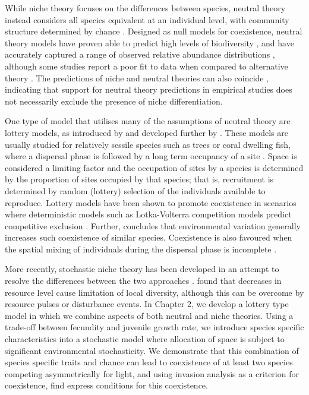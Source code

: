  While niche theory focuses on the differences between species, neutral theory instead considers all species equivalent at an individual level, with community structure determined by chance \citep[e.g.][]{hubbell1979tree,chave2004neutral,hubbell2001unified}. Designed as null models for coexistence, neutral theory models have proven able to predict high levels of biodiversity \citep[see ][ and references therein]{chave2004neutral,hubbell2001unified}, and have accurately captured a range of observed relative abundance distributions \citep[e.g.][]{volkov2003neutral}, although some studies report a poor fit to data when compared to alternative theory \citep[e.g.][]{dornelas2006coral,mcgill2006empirical}. The predictions of niche and neutral theories can also coincide \citep{chisholm2010niche}, indicating that support for neutral theory predictions in empirical studies does not necessarily exclude the presence of niche differentiation.
 
One type of model that utilises many of the assumptions of neutral theory are lottery models, as introduced by \cite{sale1978coexistence} and developed further by \cite{chesson1981environmental}. These models are usually studied for relatively sessile species such as trees or coral dwelling fish, where a dispersal phase is followed by a long term occupancy of a site \citep[e.g.][]{munday2004competitive}. Space is considered a limiting factor and the occupation of sites by a species is determined by the proportion of sites occupied by that species; that is, recruitment is determined by random (lottery) selection of the individuals available to reproduce. Lottery models have been shown to promote coexistence in scenarios where deterministic models such as Lotka-Volterra competition models predict competitive exclusion \citep[e.g.][]{chesson2000mechanisms}. Further, \cite{fagerstrom1988lotteries} concludes that environmental variation generally increases such coexistence of similar species. Coexistence is also favoured when the spatial mixing of individuals during the dispersal phase is incomplete \citep{muko2003incomplete,snyder2003local}.

More recently, stochastic niche theory has been developed in an attempt to resolve the differences between the two approaches \citep{tilman2004niche}. \cite{tilman2004niche} found that decreases in resource level cause limitation of local diversity, although this can be overcome by resource pulses or disturbance events. In Chapter 2, we develop a lottery type model in which we combine aspects of both neutral and niche theories. Using a trade-off between fecundity and juvenile growth rate, we introduce species specific characteristics into a stochastic model where  allocation of space is subject to significant environmental stochasticity. We demonstrate that this combination of species specific traits and chance can lead to coexistence of at least two species competing asymmetrically for light, and using invasion analysis as a criterion for coexistence, find express conditions for this coexistence. 

